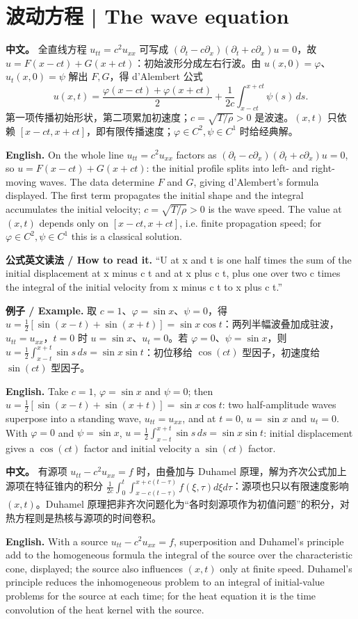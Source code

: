 \documentclass[UTF8,11pt,a4paper]{ctexart}
\newcommand{\EN}[1]{\par\noindent \textbf{English.} #1\par}
\newcommand{\READ}[1]{\par\noindent \textbf{公式英文读法 / How to read it.} #1\par}
\newcommand{\EX}[2]{\par\noindent \textbf{例子 / Example.} #1\par\EN{#2}}
\newcommand{\APS}[2]{\par\noindent\textbf{中文。} #1\par\noindent\textbf{English.} #2\par\smallskip}
\begin{document}
\section[波动方程]{波动方程 | The wave equation}
\APS{全直线方程 $u_{tt}=c^2u_{xx}$ 可写成 $(\partial_t-c\partial_x)(\partial_t+c\partial_x)u=0$，故 $u=F(x-ct)+G(x+ct)$：初始波形分成左右行波。由 $u(x,0)=\varphi$、$u_t(x,0)=\psi$ 解出 $F,G$，得 d'Alembert 公式
\[
u(x,t)=\frac{\varphi(x-ct)+\varphi(x+ct)}2+\frac1{2c}\int_{x-ct}^{x+ct}\psi(s)\,ds .
\]
第一项传播初始形状，第二项累加初速度；$c=\sqrt{T/\rho}>0$ 是波速。$(x,t)$ 只依赖 $[x-ct,x+ct]$，即有限传播速度；$\varphi\in C^2,\psi\in C^1$ 时给经典解。}{On the whole line $u_{tt}=c^2u_{xx}$ factors as $(\partial_t-c\partial_x)(\partial_t+c\partial_x)u=0$, so $u=F(x-ct)+G(x+ct)$: the initial profile splits into left- and right-moving waves. The data determine $F$ and $G$, giving d'Alembert's formula displayed. The first term propagates the initial shape and the integral accumulates the initial velocity; $c=\sqrt{T/\rho}>0$ is the wave speed. The value at $(x,t)$ depends only on $[x-ct,x+ct]$, i.e. finite propagation speed; for $\varphi\in C^2,\psi\in C^1$ this is a classical solution.}
\READ{“U at x and t is one half times the sum of the initial displacement at x minus c t and at x plus c t, plus one over two c times the integral of the initial velocity from x minus c t to x plus c t.”}
\EX{取 $c=1$、$\varphi=\sin x$、$\psi=0$，得 $u=\frac12[\sin(x-t)+\sin(x+t)]=\sin x\cos t$：两列半幅波叠加成驻波，$u_{tt}=u_{xx}$，$t=0$ 时 $u=\sin x$、$u_t=0$。若 $\varphi=0$、$\psi=\sin x$，则 $u=\frac12\int_{x-t}^{x+t}\sin s\,ds=\sin x\sin t$：初位移给 $\cos(ct)$ 型因子，初速度给 $\sin(ct)$ 型因子。}{Take $c=1$, $\varphi=\sin x$ and $\psi=0$; then $u=\frac12[\sin(x-t)+\sin(x+t)]=\sin x\cos t$: two half-amplitude waves superpose into a standing wave, $u_{tt}=u_{xx}$, and at $t=0$, $u=\sin x$ and $u_t=0$. With $\varphi=0$ and $\psi=\sin x$, $u=\frac12\int_{x-t}^{x+t}\sin s\,ds=\sin x\sin t$: initial displacement gives a $\cos(ct)$ factor and initial velocity a $\sin(ct)$ factor.}
\APS{有源项 $u_{tt}-c^2u_{xx}=f$ 时，由叠加与 Duhamel 原理，解为齐次公式加上源项在特征锥内的积分 $\frac1{2c}\int_0^t\int_{x-c(t-\tau)}^{x+c(t-\tau)}f(\xi,\tau)d\xi d\tau$：源项也只以有限速度影响 $(x,t)$。Duhamel 原理把非齐次问题化为“各时刻源项作为初值问题”的积分，对热方程则是热核与源项的时间卷积。}{With a source $u_{tt}-c^2u_{xx}=f$, superposition and Duhamel's principle add to the homogeneous formula the integral of the source over the characteristic cone, displayed; the source also influences $(x,t)$ only at finite speed. Duhamel's principle reduces the inhomogeneous problem to an integral of initial-value problems for the source at each time; for the heat equation it is the time convolution of the heat kernel with the source.}
\end{document}
